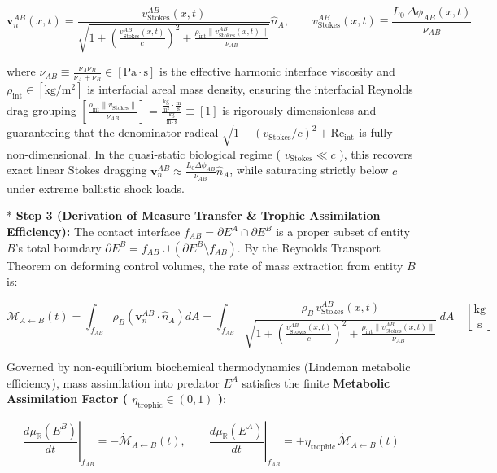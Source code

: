 \documentclass[11pt,a4paper]{article}
\theoremstyle{definition}
\theoremstyle{remark}
\begin{document}
\begin{equation}
\boxed{\mathbf{v}_n^{AB}(x, t) = \frac{v_{\text{Stokes}}^{AB}(x, t)}{\sqrt{1 + \left(\frac{v_{\text{Stokes}}^{AB}(x, t)}{c}\right)^2 + \frac{\rho_{\text{int}} \|v_{\text{Stokes}}^{AB}(x, t)\|}{\nu_{AB}}}} \hat{n}_A, \qquad v_{\text{Stokes}}^{AB}(x, t) \equiv \frac{L_0 \, \Delta \phi_{AB}(x, t)}{\nu_{AB}}}
\end{equation}


where $\nu_{AB} \equiv \frac{\nu_A \nu_B}{\nu_A + \nu_B} \in [\mathrm{Pa \cdot s}]$ is the effective harmonic interface viscosity and $\rho_{\text{int}} \in [\mathrm{kg/m^2}]$ is interfacial areal mass density, ensuring the interfacial Reynolds drag grouping $[ \frac{\rho_{\text{int}} \|v_{\text{Stokes}}\|}{\nu_{AB}} ] = \frac{\frac{\mathrm{kg}}{\mathrm{m^2}} \cdot \frac{\mathrm{m}}{\mathrm{s}}}{\frac{\mathrm{kg}}{\mathrm{m \cdot s}}} \equiv [1]$ is rigorously dimensionless and guaranteeing that the denominator radical $\sqrt{1 + (v_{\text{Stokes}}/c)^2 + \mathrm{Re}_{\text{int}}}$ is fully non-dimensional. In the quasi-static biological regime ( $v_{\text{Stokes}} \ll c$ ), this recovers exact linear Stokes dragging $\mathbf{v}_n^{AB} \approx \frac{L_0 \Delta \phi_{AB}}{\nu_{AB}}\hat{n}_A$, while saturating strictly below $c$ under extreme ballistic shock loads.

* \textbf{Step 3 (Derivation of Measure Transfer \& Trophic Assimilation Efficiency):}
The contact interface $f_{AB} = \partial E^A \cap \partial E^B$ is a proper subset of entity $B$'s total boundary $\partial E^B = f_{AB} \cup (\partial E^B \setminus f_{AB})$. By the Reynolds Transport Theorem on deforming control volumes, the rate of mass extraction from entity $B$ is:


\begin{equation}
\dot{\mathcal{M}}_{A \leftarrow B}(t) = \int_{f_{AB}} \rho_B \left(\mathbf{v}_n^{AB} \cdot \hat{n}_A\right) dA = \int_{f_{AB}} \frac{\rho_B \, v_{\text{Stokes}}^{AB}(x, t)}{\sqrt{1 + \left(\frac{v_{\text{Stokes}}^{AB}(x, t)}{c}\right)^2 + \frac{\rho_{\text{int}} \|v_{\text{Stokes}}^{AB}(x, t)\|}{\nu_{AB}}}} \, dA \quad [\frac{\mathrm{kg}}{\mathrm{s}}]
\end{equation}


Governed by non-equilibrium biochemical thermodynamics (Lindeman metabolic efficiency), mass assimilation into predator $E^A$ satisfies the finite \textbf{Metabolic Assimilation Factor ( $\eta_{\text{trophic}} \in (0, 1)$ )}:


\begin{equation}
\boxed{\left.\frac{d\mu_{\mathbb{R}}(E^B)}{dt}\right|_{f_{AB}} = -\dot{\mathcal{M}}_{A \leftarrow B}(t), \qquad \left.\frac{d\mu_{\mathbb{R}}(E^A)}{dt}\right|_{f_{AB}} = +\eta_{\text{trophic}} \, \dot{\mathcal{M}}_{A \leftarrow B}(t)}
\end{equation}
\end{document}
